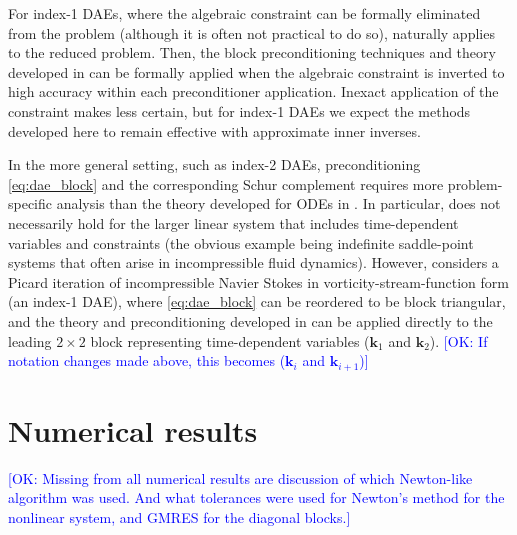 \documentclass[review]{siamart}
\newcommand{\OK}[1]{\textcolor{blue}{[OK: #1]}}
\begin{document}
For index-1 DAEs, where the algebraic constraint can be formally eliminated from
the problem (although it is often not practical to do so), 
naturally applies to the reduced problem. Then, the block preconditioning
techniques and theory developed in  can be formally applied
when the algebraic constraint is inverted to high accuracy within each
preconditioner application. Inexact application of the constraint makes
 less certain, but for index-1 DAEs we expect the methods
developed here to remain effective with approximate inner inverses.

In the more general setting, such as index-2 DAEs, preconditioning
\eqref{eq:dae_block} and the corresponding Schur complement requires more
problem-specific analysis than the theory developed for ODEs in
. In particular,  does not necessarily hold for
the larger linear system that includes time-dependent variables and constraints
(the obvious example being indefinite saddle-point systems that often arise in
incompressible fluid dynamics). However,  considers a
Picard iteration of incompressible Navier Stokes in vorticity-stream-function
form (an index-1 DAE), where \eqref{eq:dae_block} can be reordered to be block
triangular, and the theory and preconditioning developed in 
can be applied directly to the leading $2\times 2$ block representing
time-dependent variables ($\mathbf{k}_1$ and $\mathbf{k}_2$). \OK{If notation changes made above, this becomes ($\mathbf{k}_{i}$ and $\mathbf{k}_{i+1}$)}




\section{Numerical results}\label{sec:numerics}

\OK{Missing from all numerical results are discussion of which Newton-like algorithm was used. And what tolerances were used for Newton's method for the nonlinear system, and GMRES for the diagonal blocks.}
\end{document}
